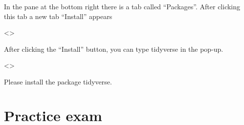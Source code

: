 \documentclass[
]{book}
\begin{document}
In the pane at the bottom right there is a tab called ``Packages''.
After clicking this tab a new tab ``Install'' appears

\textless{}\textgreater{}

After clicking the ``Install'' button, you can type tidyverse in the pop-up.

\textless{}\textgreater{}

Please install the package tidyverse.

\hypertarget{practice-exam}{%
\chapter{Practice exam}\label{practice-exam}}

  
\end{document}
